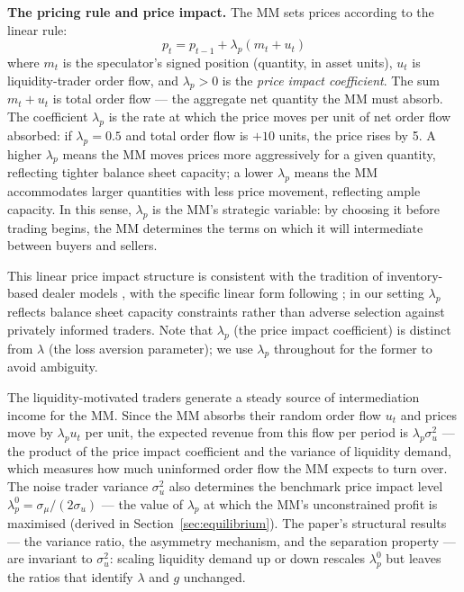 \documentclass[12pt,a4paper]{article}
\theoremstyle{definition}
\begin{document}
\noindent\textbf{The pricing rule and price impact.}
The MM sets prices according to the linear rule:
\begin{equation}
  p_t = p_{t-1} + \lambda_p(m_t + u_t)
  \label{eq:pricing_rule}
\end{equation}
where $m_t$ is the speculator's signed position (quantity, in asset
units), $u_t$ is liquidity-trader order flow, and $\lambda_p > 0$ is
the \emph{price impact coefficient}. The sum $m_t + u_t$ is total order
flow --- the aggregate net quantity the MM must absorb. The coefficient
$\lambda_p$ is the rate at which the price moves per unit of net order
flow absorbed: if $\lambda_p = 0.5$ and total order flow is $+10$
units, the price rises by 5. A higher $\lambda_p$ means the MM moves
prices more aggressively for a given quantity, reflecting tighter
balance sheet capacity; a lower $\lambda_p$ means the MM accommodates
larger quantities with less price movement, reflecting ample capacity.
In this sense, $\lambda_p$ is the MM's strategic variable: by choosing
it before trading begins, the MM determines the terms on which it will
intermediate between buyers and sellers.

This linear price impact structure is consistent with the
tradition of inventory-based dealer models
\citep{stoll1978,grossman1988}, with the specific linear form following
\citet{kyle1985}; in our setting $\lambda_p$ reflects balance sheet
capacity constraints rather than adverse selection against privately
informed traders. Note that
$\lambda_p$ (the price impact coefficient) is distinct from $\lambda$
(the loss aversion parameter); we use $\lambda_p$ throughout for the
former to avoid ambiguity.

The liquidity-motivated traders generate a steady source of
intermediation income for the MM. Since the MM absorbs their random
order flow $u_t$ and prices move by $\lambda_p u_t$ per unit, the
expected revenue from this flow per period is $\lambda_p \sigma^2_u$
--- the product of the price impact coefficient and the variance of
liquidity demand, which measures how much uninformed order flow the MM
expects to turn over. The noise trader variance $\sigma^2_u$ also
determines the benchmark price impact level
$\lambda^0_p = \sigma_\mu/(2\sigma_u)$ --- the value of $\lambda_p$
at which the MM's unconstrained profit is maximised (derived in
Section~\ref{sec:equilibrium}). The paper's structural results ---
the variance ratio, the asymmetry mechanism, and the separation
property --- are invariant to $\sigma^2_u$: scaling liquidity demand
up or down rescales $\lambda^0_p$ but leaves the ratios that identify
$\lambda$ and $g$ unchanged.
\end{document}

